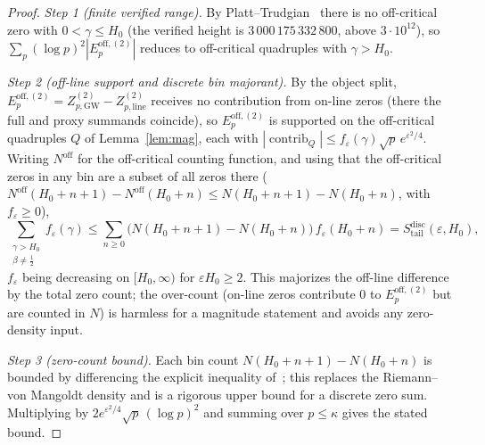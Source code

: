 \documentclass[11pt]{article}
\newcommand{\ZtwoGW}{Z_{p,\mathrm{GW}}^{(2)}}   %
\newcommand{\Ztwoline}{Z_{p,\mathrm{line}}^{(2)}} %
\newcommand{\Eoff}{E_p^{\mathrm{off},(2)}}  %
\begin{document}
\begin{proof}
\emph{Step 1 (finite verified range).}
By Platt--Trudgian~\cite{PlattTrudgian21} there is no off-critical zero with
$0<\gamma\le H_0$ (the verified height is $3\,000\,175\,332\,800$, above
$3\cdot10^{12}$), so $\sum_p(\log p)^2|\Eoff|$ reduces to off-critical
quadruples with $\gamma>H_0$.

\emph{Step 2 (off-line support and discrete bin majorant).}
By the object split, $\Eoff=\ZtwoGW-\Ztwoline$ receives no contribution from
on-line zeros (there the full and proxy summands coincide), so $\Eoff$ is
supported on the off-critical quadruples $Q$ of Lemma~\ref{lem:mag}, each with
$|\operatorname{contrib}_Q|\le f_\varepsilon(\gamma)\sqrt p\,e^{\varepsilon^2/4}$.
Writing $N^{\mathrm{off}}$ for the off-critical counting function, and using
that the off-critical zeros in any bin are a subset of all zeros there
($N^{\mathrm{off}}(H_0+n+1)-N^{\mathrm{off}}(H_0+n)\le N(H_0+n+1)-N(H_0+n)$,
with $f_\varepsilon\ge0$),
\[
\sum_{\substack{\gamma>H_0\\ \beta\ne\tfrac12}} f_\varepsilon(\gamma)
 \le \sum_{n\ge 0}\bigl(N(H_0+n+1)-N(H_0+n)\bigr)\,f_\varepsilon(H_0+n)
 = S_{\mathrm{tail}}^{\mathrm{disc}}(\varepsilon,H_0),
\]
$f_\varepsilon$ being decreasing on $[H_0,\infty)$ for $\varepsilon H_0\ge2$.
This majorizes the off-line difference by the total zero count; the
over-count (on-line zeros contribute $0$ to $\Eoff$ but are counted in $N$) is
harmless for a magnitude statement and avoids any zero-density input.

\emph{Step 3 (zero-count bound).}
Each bin count $N(H_0+n+1)-N(H_0+n)$ is bounded by differencing the
explicit inequality of~\cite{HasanalizadeShenWong21}; this replaces the
Riemann--von Mangoldt density and is a rigorous upper bound for a discrete
zero sum. Multiplying by $2e^{\varepsilon^2/4}\sqrt p\,(\log p)^2$ and summing
over $p\le\kappa$ gives the stated bound.


\end{proof}
\end{document}
